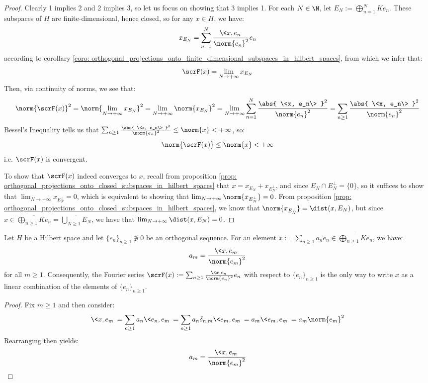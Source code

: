             \begin{proof}
                Clearly 1 implies 2 and 2 implies 3, so let us focus on showing that 3 implies 1. For each $N \in \N$, let $E_N := \bigoplus_{n = 1}^N K e_n$. These subspaces of $H$ are finite-dimensional, hence closed, so for any $x \in H$, we have:
                    $$x_{E_N} = \sum_{n = 1}^N \frac{\<x, e_n\>}{\norm{e_n}^2} e_n$$
                according to corollary \ref{coro: orthogonal_projections_onto_finite_dimensional_subspaces_in_hilbert_spaces}, from which we infer that:
                    $$\scrF(x) = \lim_{N \to +\infty} x_{E_N}$$
                Then, via continuity of norms, we see that:
                    $$\norm{\scrF(x)}^2 = \norm{\lim_{N \to +\infty} x_{E_N}}^2 = \lim_{N \to +\infty} \norm{x_{E_N}}^2 = \lim_{N \to +\infty} \sum_{n = 1}^N \frac{\abs{ \<x, e_n\> }^2}{\norm{e_n}^2} = \sum_{n \geq 1} \frac{\abs{ \<x, e_n\> }^2}{\norm{e_n}^2}$$
                Bessel's Inequality tells us that $\sum_{n \geq 1} \frac{\abs{ \<x, e_n\> }^2}{\norm{e_n}^2} \leq \norm{x} < +\infty$, so:
                    $$\norm{\scrF(x)} \leq \norm{x} < +\infty$$
                i.e. $\scrF(x)$ is convergent.

                To show that $\scrF(x)$ indeed converges to $x$, recall from proposition \ref{prop: orthogonal_projections_onto_closed_subspaces_in_hilbert_spaces} that $x = x_{E_N} + x_{E_N^{\perp}}$, and since $E_N \cap E_N^{\perp} = \{0\}$, so it suffices to show that $\lim_{N \to +\infty} x_{E_N^{\perp}} = 0$, which is equivalent to showing that $\lim_{N \to +\infty} \norm{x_{E_N^{\perp}}} = 0$. From proposition \ref{prop: orthogonal_projections_onto_closed_subspaces_in_hilbert_spaces}, we know that $\norm{x_{E_N^{\perp}}} = \dist(x, E_N)$, but since $x \in \overline{\bigoplus_{n \geq 1} K e_n} = \overline{\bigcup_{N \geq 1} E_N}$, we have that $\lim_{N \to +\infty} \dist(x, E_N) = 0$.
            \end{proof}
        \begin{theorem} \label{theorem: uniqueness_of_fourier_series}
            Let $H$ be a Hilbert space and let $\{e_n\}_{n \geq 1} \not \ni 0$ be an orthogonal sequence. For an element $x := \sum_{n \geq 1} a_n e_n \in \overline{\bigoplus_{n \geq 1} K e_n}$, we have:
                $$a_m = \frac{ \<x, e_m\> }{ \norm{e_m}^2 }$$
            for all $m \geq 1$. Consequently, the Fourier series $\scrF(x) := \sum_{n \geq 1} \frac{\<x, e_n\>}{\norm{e_n}^2} e_n$ with respect to $\{e_n\}_{n \geq 1}$ is the only way to write $x$ as a linear combination of the elements of $\{e_n\}_{n \geq 1}$.
        \end{theorem}
            \begin{proof}
                Fix $m \geq 1$ and then consider:
                    $$\<x, e_m\> = \sum_{n \geq 1} a_n \<e_n, e_m\> = \sum_{n \geq 1} a_n \delta_{n, m} \<e_m, e_m\> = a_m \<e_m, e_m\> = a_m \norm{e_m}^2$$
                Rearranging then yields:
                    $$a_m = \frac{\<x, e_m\>}{\norm{e_m}^2}$$
            \end{proof}

